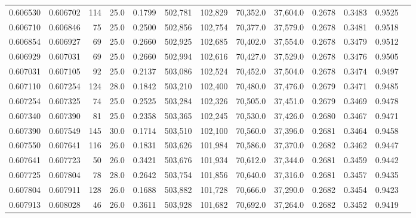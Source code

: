 \begin{tabular}{rrrrrrrrrrrrr}
0.606530 & 0.606702 &   114 & 25.0 &                                     0.1799 & 502,781 & 102,829 &  70,352.0 &  37,604.0 & 0.2678 & 0.3483 & 0.9525 \\
0.606710 & 0.606846 &    75 & 25.0 &                                     0.2500 & 502,856 & 102,754 &  70,377.0 &  37,579.0 & 0.2678 & 0.3481 & 0.9518 \\
0.606854 & 0.606927 &    69 & 25.0 &                                     0.2660 & 502,925 & 102,685 &  70,402.0 &  37,554.0 & 0.2678 & 0.3479 & 0.9512 \\
0.606929 & 0.607031 &    69 & 25.0 &                                     0.2660 & 502,994 & 102,616 &  70,427.0 &  37,529.0 & 0.2678 & 0.3476 & 0.9505 \\
0.607031 & 0.607105 &    92 & 25.0 &                                     0.2137 & 503,086 & 102,524 &  70,452.0 &  37,504.0 & 0.2678 & 0.3474 & 0.9497 \\
0.607110 & 0.607254 &   124 & 28.0 &                                     0.1842 & 503,210 & 102,400 &  70,480.0 &  37,476.0 & 0.2679 & 0.3471 & 0.9485 \\
0.607254 & 0.607325 &    74 & 25.0 &                                     0.2525 & 503,284 & 102,326 &  70,505.0 &  37,451.0 & 0.2679 & 0.3469 & 0.9478 \\
0.607340 & 0.607390 &    81 & 25.0 &                                     0.2358 & 503,365 & 102,245 &  70,530.0 &  37,426.0 & 0.2680 & 0.3467 & 0.9471 \\
0.607390 & 0.607549 &   145 & 30.0 &                                     0.1714 & 503,510 & 102,100 &  70,560.0 &  37,396.0 & 0.2681 & 0.3464 & 0.9458 \\
0.607550 & 0.607641 &   116 & 26.0 &                                     0.1831 & 503,626 & 101,984 &  70,586.0 &  37,370.0 & 0.2682 & 0.3462 & 0.9447 \\
0.607641 & 0.607723 &    50 & 26.0 &                                     0.3421 & 503,676 & 101,934 &  70,612.0 &  37,344.0 & 0.2681 & 0.3459 & 0.9442 \\
0.607725 & 0.607804 &    78 & 28.0 &                                     0.2642 & 503,754 & 101,856 &  70,640.0 &  37,316.0 & 0.2681 & 0.3457 & 0.9435 \\
0.607804 & 0.607911 &   128 & 26.0 &                                     0.1688 & 503,882 & 101,728 &  70,666.0 &  37,290.0 & 0.2682 & 0.3454 & 0.9423 \\
0.607913 & 0.608028 &    46 & 26.0 &                                     0.3611 & 503,928 & 101,682 &  70,692.0 &  37,264.0 & 0.2682 & 0.3452 & 0.9419 \\

\end{tabular}
